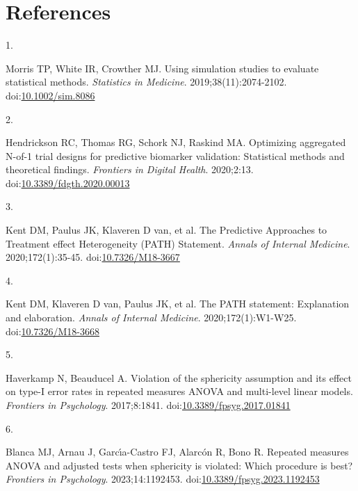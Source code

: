 \documentclass[
  11pt,
]{article}
\newlength{\cslhangindent}
\newlength{\csllabelwidth}
\newenvironment{CSLReferences}[2] %
 {\begin{list}{}{%
  \setlength{\itemindent}{0pt}
  \setlength{\leftmargin}{0pt}
  \setlength{\parsep}{0pt}
  \ifodd #1
   \setlength{\leftmargin}{\cslhangindent}
   \setlength{\itemindent}{-1\cslhangindent}
  \fi
  \setlength{\itemsep}{#2\baselineskip}}}
 {\end{list}}
\newcommand{\CSLLeftMargin}[1]{\parbox[t]{\csllabelwidth}{\strut#1\strut}}
\newcommand{\CSLRightInline}[1]{\parbox[t]{\linewidth - \csllabelwidth}{\strut#1\strut}}
\begin{document}
\section{References}\label{references}

\protect{}\label{refs}
\begin{CSLReferences}{0}{1}
\CSLLeftMargin{1. }%
\CSLRightInline{Morris TP, White IR, Crowther MJ. Using simulation studies to evaluate statistical methods. \emph{Statistics in Medicine}. 2019;38(11):2074-2102. doi:\href{https://doi.org/10.1002/sim.8086}{10.1002/sim.8086}}

\CSLLeftMargin{2. }%
\CSLRightInline{Hendrickson RC, Thomas RG, Schork NJ, Raskind MA. Optimizing aggregated {N}-of-1 trial designs for predictive biomarker validation: Statistical methods and theoretical findings. \emph{Frontiers in Digital Health}. 2020;2:13. doi:\href{https://doi.org/10.3389/fdgth.2020.00013}{10.3389/fdgth.2020.00013}}

\CSLLeftMargin{3. }%
\CSLRightInline{{Kent DM, Paulus JK, Klaveren D van, et al.} The {P}redictive {A}pproaches to {T}reatment effect {H}eterogeneity ({PATH}) {S}tatement. \emph{Annals of Internal Medicine}. 2020;172(1):35-45. doi:\href{https://doi.org/10.7326/M18-3667}{10.7326/M18-3667}}

\CSLLeftMargin{4. }%
\CSLRightInline{{Kent DM, Klaveren D van, Paulus JK, et al.} The {PATH} statement: Explanation and elaboration. \emph{Annals of Internal Medicine}. 2020;172(1):W1-W25. doi:\href{https://doi.org/10.7326/M18-3668}{10.7326/M18-3668}}

\CSLLeftMargin{5. }%
\CSLRightInline{Haverkamp N, Beauducel A. Violation of the sphericity assumption and its effect on type-{I} error rates in repeated measures {ANOVA} and multi-level linear models. \emph{Frontiers in Psychology}. 2017;8:1841. doi:\href{https://doi.org/10.3389/fpsyg.2017.01841}{10.3389/fpsyg.2017.01841}}

\CSLLeftMargin{6. }%
\CSLRightInline{Blanca MJ, Arnau J, Garcı́a-Castro FJ, Alarcón R, Bono R. Repeated measures {ANOVA} and adjusted tests when sphericity is violated: Which procedure is best? \emph{Frontiers in Psychology}. 2023;14:1192453. doi:\href{https://doi.org/10.3389/fpsyg.2023.1192453}{10.3389/fpsyg.2023.1192453}}


\end{CSLReferences}
\end{document}
